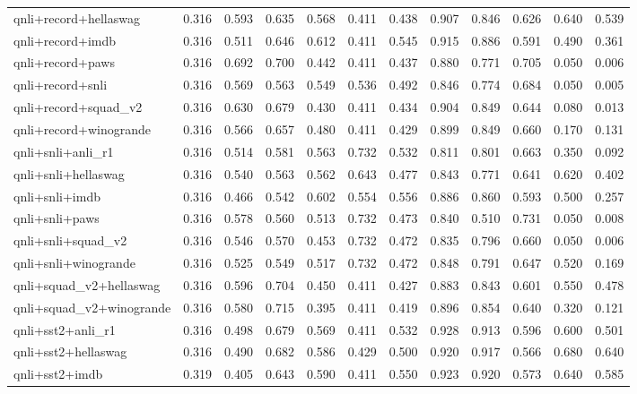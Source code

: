 \begin{table}[t]
\begin{tabular}{lrrrrrrrrrrr}
    qnli+record+hellaswag & 0.316 & 0.593 & 0.635 & 0.568 & 0.411 & 0.438 & 0.907 & 0.846 & 0.626 & 0.640 & 0.539 \\
    qnli+record+imdb & 0.316 & 0.511 & 0.646 & 0.612 & 0.411 & 0.545 & 0.915 & 0.886 & 0.591 & 0.490 & 0.361 \\
    qnli+record+paws & 0.316 & 0.692 & 0.700 & 0.442 & 0.411 & 0.437 & 0.880 & 0.771 & 0.705 & 0.050 & 0.006 \\
    qnli+record+snli & 0.316 & 0.569 & 0.563 & 0.549 & 0.536 & 0.492 & 0.846 & 0.774 & 0.684 & 0.050 & 0.005 \\
    qnli+record+squad\_v2 & 0.316 & 0.630 & 0.679 & 0.430 & 0.411 & 0.434 & 0.904 & 0.849 & 0.644 & 0.080 & 0.013 \\
    qnli+record+winogrande & 0.316 & 0.566 & 0.657 & 0.480 & 0.411 & 0.429 & 0.899 & 0.849 & 0.660 & 0.170 & 0.131 \\
    qnli+snli+anli\_r1 & 0.316 & 0.514 & 0.581 & 0.563 & 0.732 & 0.532 & 0.811 & 0.801 & 0.663 & 0.350 & 0.092 \\
    qnli+snli+hellaswag & 0.316 & 0.540 & 0.563 & 0.562 & 0.643 & 0.477 & 0.843 & 0.771 & 0.641 & 0.620 & 0.402 \\
    qnli+snli+imdb & 0.316 & 0.466 & 0.542 & 0.602 & 0.554 & 0.556 & 0.886 & 0.860 & 0.593 & 0.500 & 0.257 \\
    qnli+snli+paws & 0.316 & 0.578 & 0.560 & 0.513 & 0.732 & 0.473 & 0.840 & 0.510 & 0.731 & 0.050 & 0.008 \\
    qnli+snli+squad\_v2 & 0.316 & 0.546 & 0.570 & 0.453 & 0.732 & 0.472 & 0.835 & 0.796 & 0.660 & 0.050 & 0.006 \\
    qnli+snli+winogrande & 0.316 & 0.525 & 0.549 & 0.517 & 0.732 & 0.472 & 0.848 & 0.791 & 0.647 & 0.520 & 0.169 \\
    qnli+squad\_v2+hellaswag & 0.316 & 0.596 & 0.704 & 0.450 & 0.411 & 0.427 & 0.883 & 0.843 & 0.601 & 0.550 & 0.478 \\
    qnli+squad\_v2+winogrande & 0.316 & 0.580 & 0.715 & 0.395 & 0.411 & 0.419 & 0.896 & 0.854 & 0.640 & 0.320 & 0.121 \\
    qnli+sst2+anli\_r1 & 0.316 & 0.498 & 0.679 & 0.569 & 0.411 & 0.532 & 0.928 & 0.913 & 0.596 & 0.600 & 0.501 \\
    qnli+sst2+hellaswag & 0.316 & 0.490 & 0.682 & 0.586 & 0.429 & 0.500 & 0.920 & 0.917 & 0.566 & 0.680 & 0.640 \\
    qnli+sst2+imdb & 0.319 & 0.405 & 0.643 & 0.590 & 0.411 & 0.550 & 0.923 & 0.920 & 0.573 & 0.640 & 0.585 \\

\end{tabular}
\end{table}
